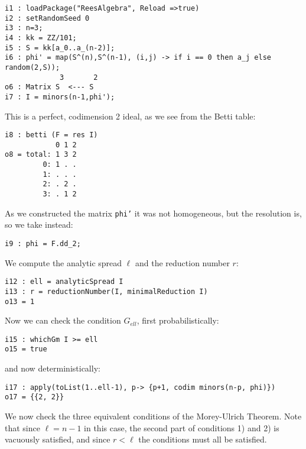 \documentclass[twoside,12pt, leqno]{amsart}
\begin{document}
\begin{footnotesize}
 \begin{verbatim}
i1 : loadPackage("ReesAlgebra", Reload =>true)
i2 : setRandomSeed 0
i3 : n=3;
i4 : kk = ZZ/101;
i5 : S = kk[a_0..a_(n-2)];
i6 : phi' = map(S^(n),S^(n-1), (i,j) -> if i == 0 then a_j else random(2,S));
             3       2
o6 : Matrix S  <--- S
i7 : I = minors(n-1,phi');
\end{verbatim}
\end{footnotesize}
This is a perfect, codimension 2 ideal, as we see from the Betti table:
\begin{footnotesize}
 \begin{verbatim}
i8 : betti (F = res I)
            0 1 2
o8 = total: 1 3 2
         0: 1 . .
         1: . . .
         2: . 2 .
         3: . 1 2
\end{verbatim}
\end{footnotesize}
As we constructed the matrix {\tt phi'} it was not homogeneous, but the resolution is, so we take instead:
\begin{footnotesize}
 \begin{verbatim}
i9 : phi = F.dd_2;
 \end{verbatim}
 \end{footnotesize}
We  compute the analytic spread $\ell$ and the reduction number $r$:
\begin{footnotesize}
 \begin{verbatim}
i12 : ell = analyticSpread I
i13 : r = reductionNumber(I, minimalReduction I)
o13 = 1
\end{verbatim}
\end{footnotesize}
Now we can check the condition $G_{ell}$, first probabilistically:
\begin{footnotesize}
 \begin{verbatim}
i15 : whichGm I >= ell
o15 = true
\end{verbatim}
\end{footnotesize}
and now deterministically:
\begin{footnotesize}
 \begin{verbatim}
i17 : apply(toList(1..ell-1), p-> {p+1, codim minors(n-p, phi)})
o17 = {{2, 2}}
\end{verbatim}
\end{footnotesize}
We now check the three equivalent conditions of the Morey-Ulrich Theorem.
           Note that since $\ell = n-1$ in this case, the second part of conditions
           1) and 2) is vacuously satisfied, and since $r<\ell$
           the conditions must all be satisfied.
\end{document}

